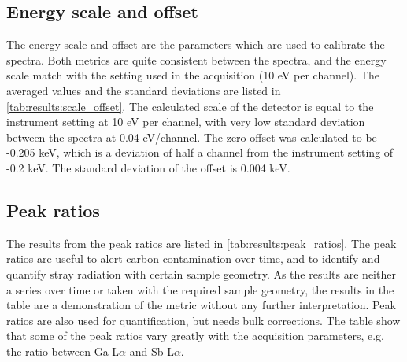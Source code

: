 


\subsection*{Energy scale and offset}
\label{results:setup:scale_offset}

The energy scale and offset are the parameters which are used to calibrate the spectra.
Both metrics are quite consistent between the spectra, and the energy scale match with the setting used in the acquisition (10 eV per channel).
The averaged values and the standard deviations are listed in \cref{tab:results:scale_offset}.
The calculated scale of the detector is equal to the instrument setting at 10 eV per channel, with very low standard deviation between the spectra at 0.04 eV/channel.
The zero offset was calculated to be -0.205 keV, which is a deviation of half a channel from the instrument setting of -0.2 keV.
The standard deviation of the offset is 0.004 keV.






\subsection*{Peak ratios}
\label{results:setup:peak_ratios}

The results from the peak ratios are listed in \cref{tab:results:peak_ratios}.
The peak ratios are useful to alert carbon contamination over time, and to identify and quantify stray radiation with certain sample geometry.
As the results are neither a series over time or taken with the required sample geometry, the results in the table are a demonstration of the metric without any further interpretation.
Peak ratios are also used for quantification, but needs bulk corrections.
The table show that some of the peak ratios vary greatly with the acquisition parameters, e.g. the ratio between Ga L$\alpha$ and Sb L$\alpha$.






